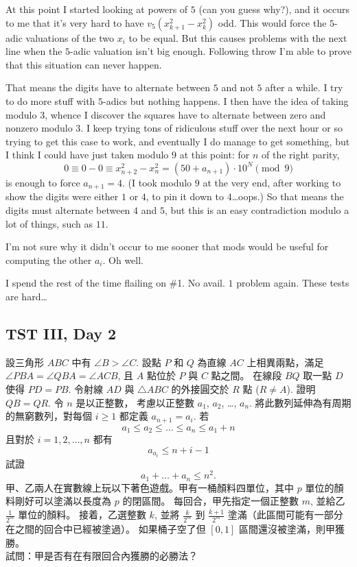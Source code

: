 \documentclass[11pt]{scrreprt}
\begin{document}
At this point I started looking at powers of $5$ (can you guess why?),
and it occurs to me that it's very hard to have $v_5(x_{k+1}^2 - x_k^2)$ odd.
This would force the $5$-adic valuations of the two $x_i$ to be equal.
But this causes problems with the next line when the $5$-adic valuation isn't big enough.
Following throw I'm able to prove that this situation can never happen.

That means the digits have to alternate between $5$ and not $5$ after a while.
I try to do more stuff with $5$-adics but nothing happens.
I then have the idea of taking modulo $3$,
whence I discover the squares have to alternate between zero and nonzero modulo $3$.
I keep trying tons of ridiculous stuff over the next hour or so trying to get this case to work,
and eventually I do manage to get something, but I think I could have just taken modulo $9$ at this point:
for $n$ of the right parity,
\[ 0 \equiv 0-0 \equiv x_{n+2}^2 - x_n^2 = \left( 50 + a_{n+1} \right) \cdot 10^N \pmod{9} \]
is enough to force $a_{n+1} = 4$.
(I took modulo $9$ at the very end, after working to show the digits were either $1$ or $4$,
to pin it down to $4$\dots oops.) So that means the digits must alternate between $4$ and $5$,
but this is an easy contradiction modulo a lot of things, such as $11$.

I'm not sure why it didn't occur to me sooner that mods would be useful for computing the other $a_i$.
Oh well.

I spend the rest of the time flailing on \#1. No avail. $1$ problem again. These tests are hard\dots



\subsection{TST III, Day 2}
\begin{enumerate}
  \setcounter{enumi}{3}
  \ii 設三角形 $ABC$ 中有 $\angle B > \angle C$. 設點 $P$ 和 $Q$ 為直線 $AC$ 上相異兩點，滿足 $\angle PBA = \angle QBA = \angle ACB$, 且 $A$ 點位於 $P$ 與 $C$ 點之間。 在線段 $BQ$ 取一點 $D$ 使得 $PD = PB$.
  令射線 $AD$ 與 $\triangle ABC$ 的外接圓交於 $R$ 點 ($R \neq A$). 證明 $QB = QR$. %
  \ii 令 $n$ 是以正整數， 考慮以正整數 $a_1$, $a_2$, \dots, $a_n$. 將此數列延伸為有周期的無窮數列，對每個 $i \ge 1$ 都定義 $a_{n+1} = a_i$. 若
  \[ a_1 \le a_2 \le \dots \le a_n \le a_1 + n \]
  且對於 $i = 1,2,\dots,n$ 都有
  \[ a_{a_i} \le n+i-1 \]
  試證
  \[ a_1 + \dots + a_n \le n^2. \]
  \ii 甲、乙兩人在實數線上玩以下著色遊戲。甲有一桶顏料四單位，其中 $p$ 單位的顏料剛好可以塗滿以長度為 $p$ 的閉區間。
  每回合，甲先指定一個正整數 $m$, 並給乙 $\frac{1}{2^m}$ 單位的顏料。
  接着，乙選整數 $k$, 並將 $\frac{k}{2^m}$ 到 $\frac{k+1}{2^m}$ 塗滿（此區間可能有一部分在之間的回合中已經被塗過）。
  如果桶子空了但 $[0,1]$ 區間還沒被塗滿，則甲獲勝。 \\
  試問：甲是否有在有限回合內獲勝的必勝法？ %
\end{enumerate}
\end{document}
